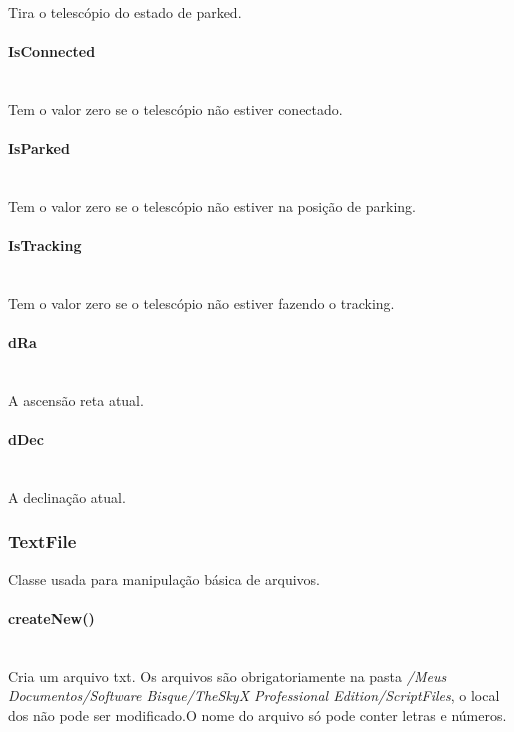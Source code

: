 \documentclass{article}
\begin{document}
Tira o telescópio do estado de parked.

\paragraph{IsConnected}\mbox{}\\

Tem o valor zero se o telescópio não estiver conectado.

\paragraph{IsParked}\mbox{}\\

Tem o valor zero se o telescópio não estiver na posição de parking.

\paragraph{IsTracking}\mbox{}\\

Tem o valor zero se o telescópio não estiver fazendo o tracking.

\paragraph{dRa}\mbox{}\\

A ascensão reta atual.

\paragraph{dDec}\mbox{}\\

A declinação atual.

\subsubsection{TextFile}

Classe usada para manipulação básica de arquivos.

\paragraph{createNew()}\mbox{}\\

Cria um arquivo txt. Os arquivos são obrigatoriamente na pasta \emph{/Meus Documentos/Software Bisque/TheSkyX Professional Edition/ScriptFiles}, o local dos não pode ser modificado.O nome do arquivo só pode conter letras e números.
\end{document}

